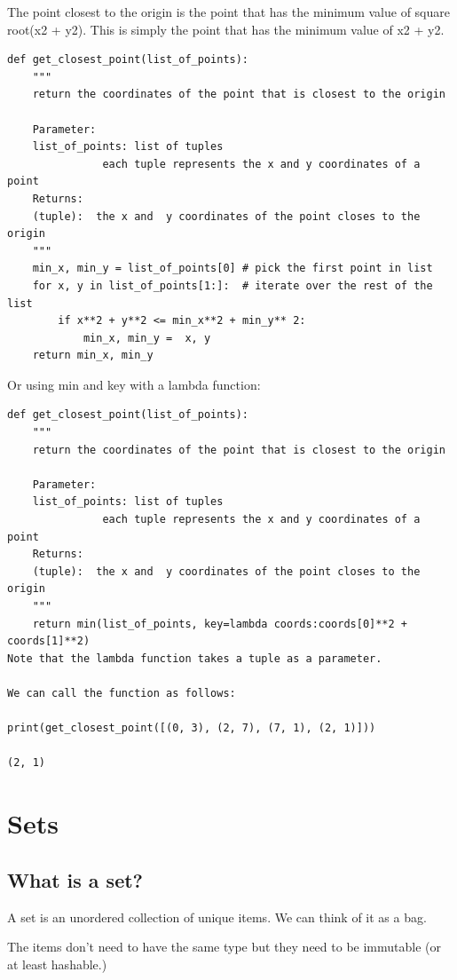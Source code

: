 \documentclass{article}
\begin{document}
The point closest to the origin is the point that has the minimum value of square root(x2 + y2). This is simply the point that has the minimum value of  x2 + y2.

\begin{lstlisting}
def get_closest_point(list_of_points):
    """ 
    return the coordinates of the point that is closest to the origin
    
    Parameter:
    list_of_points: list of tuples 
               each tuple represents the x and y coordinates of a  point 
    Returns:
    (tuple):  the x and  y coordinates of the point closes to the origin
    """
    min_x, min_y = list_of_points[0] # pick the first point in list
    for x, y in list_of_points[1:]:  # iterate over the rest of the list
        if x**2 + y**2 <= min_x**2 + min_y** 2:
            min_x, min_y =  x, y
    return min_x, min_y
\end{lstlisting}

Or using min and key with a lambda function:

\begin{lstlisting}
def get_closest_point(list_of_points):
    """ 
    return the coordinates of the point that is closest to the origin
    
    Parameter:
    list_of_points: list of tuples 
               each tuple represents the x and y coordinates of a  point 
    Returns:
    (tuple):  the x and  y coordinates of the point closes to the origin
    """
    return min(list_of_points, key=lambda coords:coords[0]**2 + coords[1]**2)
Note that the lambda function takes a tuple as a parameter.

We can call the function as follows:

print(get_closest_point([(0, 3), (2, 7), (7, 1), (2, 1)]))

(2, 1)
\end{lstlisting}

\section{Sets}
\subsection{What is a set?}

A set is an unordered collection of unique items.  We can think of it as a bag.

The items don't need to have the same type but they need to be immutable (or at least hashable.)
\end{document}
